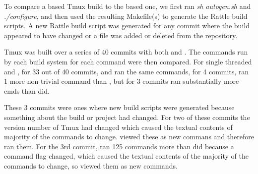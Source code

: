 To compare a \Rattle based Tmux build to the \Make based one, we first ran \emph{sh autogen.sh} and \emph{./configure}, and then used the resulting Makefile(s) to generate the Rattle build scripts.  A new Rattle build script was generated for any commit where the build appeared to have changed or a file was added or deleted from the repository.

Tmux was built over a series of 40 commits with both \Make and \Rattle.  The commands run by each build system for each command were then compared.  For single threaded \Rattle and \Make, for 33 out of 40 commits, \Rattle and \Make ran the same commands, for 4 commits, \Make ran 1 more non-trivial command than \Rattle, but for 3 commits \Rattle ran substantially more cmds than \Make did.

These 3 commits were ones where new \Rattle build scripts were generated because something about the build or project had changed.  For two of these commits the version number of Tmux had changed which caused the textual contents of majority of the commands to change.  \Rattle viewed these as new commans and therefore ran them.  For the 3rd commit, \Rattle ran 125 commands more than \Make did because a command flag changed, which caused the textual contents of the majority of the commands to change, so \Rattle viewed them as new commands.














